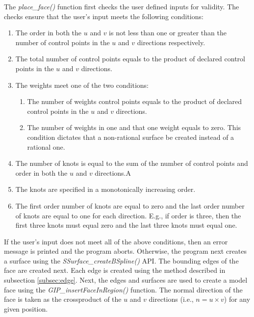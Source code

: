 \documentclass[a4paper, 12pt]{article}
\begin{document}
The \emph{place\_face()} function first checks the user defined inputs
for validity. The checks ensure that the user's input meets the 
following conditions:
\begin{enumerate}
  \item The order in both the $u$ and $v$ is not less than one or greater than
      the number of control points in the $u$ and $v$ directions respectively. 
  \item The total number of control points equals to the product of 
      declared control points in the $u$ and $v$ directions.
  \item The weights meet one of the two conditions:
  \begin{enumerate}
    \item The number of weights control points equals to the product of 
        declared control points in the $u$ and $v$ directions.
    \item The number of weights in one and that one weight equals to zero. 
        This condition dictates that a non-rational surface be created 
        instead of a rational one.
  \end{enumerate}
  \item The number of knots is equal to the sum of the number of control points
      and order in both the $u$ and $v$ directions.A
  \item The knots are specified in a monotonically increasing order. 
  \item The first order number of knots are equal to zero and the last order number 
      of knots are equal to one for each direction. 
      E.g., if order is three, then the first three
      knots must equal zero and the last three knots must equal one.
\end{enumerate}

If the user's input does not meet all of the above conditions, then
an error message is printed and the program aborts. Otherwise, 
the program next creates a surface using the \emph{SSurface\_createBSpline()} 
API. The bounding edges of the face are created next. 
Each edge is created using the method described in 
subsection \ref{subsec:edge}. Next, the edges and surfaces are used to 
create a model face using the \emph{GIP\_insertFaceInRegion()} function. 
The normal direction of the face is taken as the crossproduct of 
the $u$ and $v$ directions (i.e., $n=u\times v$) for any given position. 
\end{document}
